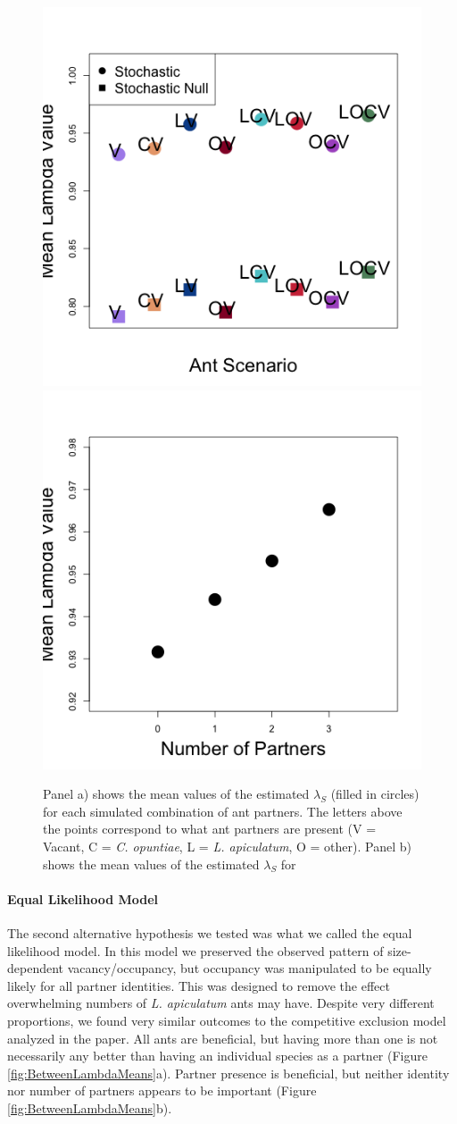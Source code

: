 \documentclass[11pt]{article}
\begin{document}
\begin{figure}
\includegraphics[width=0.61\linewidth]{Figures/freq_outputmeans_s_sn.png}
\includegraphics[width=0.39\linewidth]{Figures/freq_num_partners_s.png}
\caption{Panel a) shows the mean values of the estimated $\lambda_{S}$ (filled in circles) for each simulated combination of ant partners. The letters above the points correspond to what ant partners are present (V = Vacant, C = \textit{C. opuntiae}, L = \textit{L. apiculatum}, O = other). Panel b) shows the mean values of the estimated $\lambda_{S}$ for }
\label{fig:FreqLambdaMeans}
\end{figure}

\paragraph{Equal Likelihood Model}
The second alternative hypothesis we tested was what we called the equal likelihood model.
In this model we preserved the observed pattern of size-dependent vacancy/occupancy, but occupancy was manipulated to be equally likely for all partner identities. 
This was designed to remove the effect overwhelming numbers of \textit{L. apiculatum} ants may have. 
Despite very different proportions, we found very similar outcomes to the competitive exclusion model analyzed in the paper. 
All ants are beneficial, but having more than one is not necessarily any better than having an individual species as a partner (Figure \ref{fig:BetweenLambdaMeans}a).
Partner presence is beneficial, but neither identity nor number of partners appears to be important (Figure \ref{fig:BetweenLambdaMeans}b).
\end{document}
